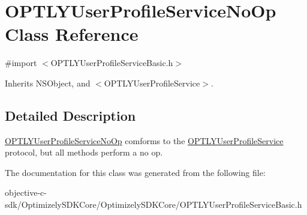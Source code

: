 \hypertarget{interface_o_p_t_l_y_user_profile_service_no_op}{}\section{O\+P\+T\+L\+Y\+User\+Profile\+Service\+No\+Op Class Reference}
\label{interface_o_p_t_l_y_user_profile_service_no_op}


{\ttfamily \#import $<$O\+P\+T\+L\+Y\+User\+Profile\+Service\+Basic.\+h$>$}



Inherits N\+S\+Object, and $<$\+O\+P\+T\+L\+Y\+User\+Profile\+Service$>$.



\subsection{Detailed Description}
\mbox{\hyperlink{interface_o_p_t_l_y_user_profile_service_no_op}{O\+P\+T\+L\+Y\+User\+Profile\+Service\+No\+Op}} comforms to the \mbox{\hyperlink{class_o_p_t_l_y_user_profile_service-p}{O\+P\+T\+L\+Y\+User\+Profile\+Service}} protocol, but all methods perform a no op. 

The documentation for this class was generated from the following file\+:\begin{DoxyCompactItemize}
\item 
objective-\/c-\/sdk/\+Optimizely\+S\+D\+K\+Core/\+Optimizely\+S\+D\+K\+Core/O\+P\+T\+L\+Y\+User\+Profile\+Service\+Basic.\+h\end{DoxyCompactItemize}
